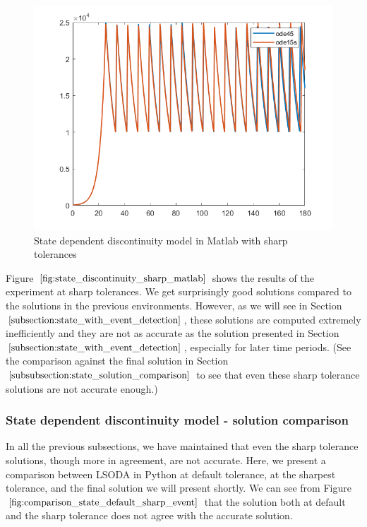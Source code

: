 \begin{figure}[h]
\centering
\includegraphics[width=0.7\linewidth]{./figures/state_discontinuity_sharp_matlab}
\caption{State dependent discontinuity model in Matlab with sharp tolerances}
\label{fig:state_discontinuity_sharp_matlab}
\end{figure}

Figure $\ref{fig:state_discontinuity_sharp_matlab}$ shows the results of the experiment at sharp tolerances. We get surprisingly good solutions compared to the solutions in the previous environments. However, as we will see in Section $\ref{subsection:state_with_event_detection}$, these solutions are computed extremely inefficiently and they are not as accurate as the solution presented in Section $\ref{subsection:state_with_event_detection}$, especially for later time periods. (See the comparison against the final solution in Section $\ref{subsubsection:state_solution_comparison}$ to see that even these sharp tolerance solutions are not accurate enough.)


\subsubsection{State dependent discontinuity model - solution comparison}
\label{subsubsection:state_solution_comparison}
In all the previous subsections, we have maintained that even the sharp tolerance solutions, though more in agreement, are not accurate. Here, we present a comparison between LSODA in Python at default tolerance, at the sharpest tolerance, and the final solution we will present shortly. We can see from Figure $\ref{fig:comparison_state_default_sharp_event}$ that the solution both at default and the sharp tolerance does not agree with the accurate solution. 

